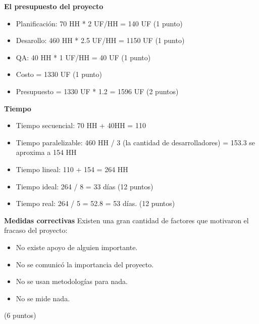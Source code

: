 \documentclass[10pt]{examdesign}
\begin{document}
\begin{shortanswer}[title={Pregunta de desarrollo}, rearrange=yes,resetcounter=yes]
\begin{question}
	\begin{answer}
	    {\bf El presupuesto del proyecto}
	    \begin{itemize}
	     \item Planificación: 70 HH * 2 UF/HH = 140 UF (1 punto)
	     \item Desarollo: 460 HH * 2.5 UF/HH = 1150 UF (1 punto)
	     \item QA: 40 HH * 1 UF/HH = 40 UF (1 punto)
	     \item Costo = 1330 UF (1 punto)
	     \item Presupuesto = 1330 UF * 1.2 = 1596 UF (2 puntos)
	    \end{itemize}

	    {\bf Tiempo}
	    \begin{itemize}
	     \item Tiempo secuencial: 70 HH + 40HH = 110
	     \item Tiempo paralelizable: 460 HH / 3 (la cantidad de desarrolladores) = 153.3 se aproxima a 154 HH
	     \item Tiempo lineal: 110 + 154 = 264 HH 
	    \end{itemize}

	    \begin{itemize}
	     \item Tiempo ideal: 264 / 8 = 33 días (12 puntos)
	     \item Tiempo real: 264 / 5 = 52.8 = 53 días. (12 puntos)
	    \end{itemize}

	    {\bf Medidas correctivas}
	    Existen una gran cantidad de factores que motivaron el fracaso del proyecto:
	    \begin{itemize}
	     \item No existe apoyo de alguien importante.
	     \item No se comunicó la importancia del proyecto.
	     \item No se usan metodologías para nada.
	     \item No se mide nada.
	    \end{itemize}
	    (6 puntos)
	    \newline
	    

\end{answer}
\end{question}
\end{shortanswer}
\end{document}
